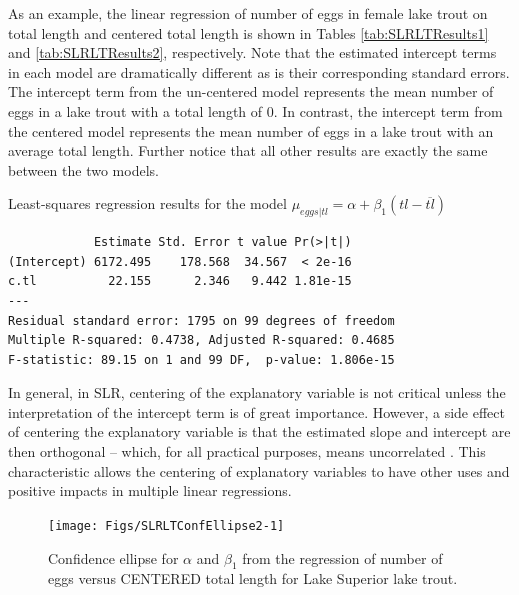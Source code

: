 \documentclass[10pt,openany]{book}\usepackage[]{graphicx}\usepackage[]{color}
\makeatletter
\newenvironment{kframe}{%
 \def\at@end@of@kframe{}%
 \ifinner\ifhmode%
  \def\at@end@of@kframe{\end{minipage}}%
  \begin{minipage}{\columnwidth}%
 \fi\fi%
 \def\FrameCommand##1{\hskip\@totalleftmargin \hskip-\fboxsep
 \colorbox{shadecolor}{##1}\hskip-\fboxsep
     \hskip-\linewidth \hskip-\@totalleftmargin \hskip\columnwidth}%
 \MakeFramed {\advance\hsize-\width
   \@totalleftmargin\z@ \linewidth\hsize
   \@setminipage}}%
 {\par\unskip\endMakeFramed%
 \at@end@of@kframe}
\newenvironment{knitrout}{}{} %
\makeatother
\begin{document}
As an example, the linear regression of number of eggs in female lake trout on total length and centered total length is shown in Tables \ref{tab:SLRLTResults1} and \ref{tab:SLRLTResults2}, respectively.  Note that the estimated intercept terms in each model are dramatically different as is their corresponding standard errors.  The intercept term from the un-centered model represents the mean number of eggs in a lake trout with a total length of 0.  In contrast, the intercept term from the centered model represents the mean number of eggs in a lake trout with an average total length.  Further notice that all other results are exactly the same between the two models.

\begin{table}[h]
  \centering
  \caption{Least-squares regression results for the model $\mu_{eggs|tl} = \alpha + \beta_{1}(tl-\overline{tl})$}\label{tab:SLRLTResults2}
\begin{knitrout}
\color{fgcolor}\begin{kframe}
\begin{verbatim}
            Estimate Std. Error t value Pr(>|t|)
(Intercept) 6172.495    178.568  34.567  < 2e-16
c.tl          22.155      2.346   9.442 1.81e-15
---
Residual standard error: 1795 on 99 degrees of freedom
Multiple R-squared: 0.4738,	Adjusted R-squared: 0.4685 
F-statistic: 89.15 on 1 and 99 DF,  p-value: 1.806e-15 
\end{verbatim}
\end{kframe}
\end{knitrout}
\end{table}

In general, in SLR, centering of the explanatory variable is not critical unless the interpretation of the intercept term is of great importance.  However, a side effect of centering the explanatory variable is that the estimated slope and intercept are then orthogonal -- which, for all practical purposes, means uncorrelated .  This characteristic allows the centering of explanatory variables to have other uses and positive impacts in multiple linear regressions.

\begin{knitrout}
\color{fgcolor}\begin{figure}[h]

{\centering \texttt{[image: Figs/SLRLTConfEllipse2-1]} 

}

\caption[Confidence ellipse for ]{Confidence ellipse for $\alpha$ and $\beta_{1}$ from the regression of number of eggs versus CENTERED total length for Lake Superior lake trout.}\label{fig:SLRLTConfEllipse2}
\end{figure}


\end{knitrout}
\end{document}
